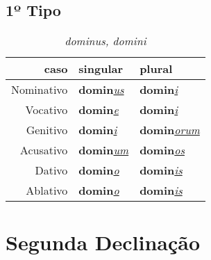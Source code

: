 \documentclass{article}
\newcommand{\radicaldesinencia}[2]{\textbf{#1}\textit{\underline{#2}}}
\begin{document}
\subsection*{1º Tipo}
\begin{table}[H]
\centering
\caption*{\textit{dominus, domini}}
\vspace{0.2cm}
\begin{tabular}{r|l|l}
\hline
caso			&	singular					& plural 						\\
\hline                                    		
\hline
Nominativo	&	\radicaldesinencia{domin}{us}	& \radicaldesinencia{domin}{i}	\\
Vocativo		&	\radicaldesinencia{domin}{e}	& \radicaldesinencia{domin}{i}	\\
Genitivo		&	\radicaldesinencia{domin}{i}		& \radicaldesinencia{domin}{orum}	\\
Acusativo	&	\radicaldesinencia{domin}{um}	& \radicaldesinencia{domin}{os}	\\
Dativo		&	\radicaldesinencia{domin}{o}	& \radicaldesinencia{domin}{is}		\\
Ablativo		&	\radicaldesinencia{domin}{o}	& \radicaldesinencia{domin}{is}		\\


 \hline
\end{tabular}
\end{table}
\clearpage




\section*{Segunda Declinação}
\end{document}
